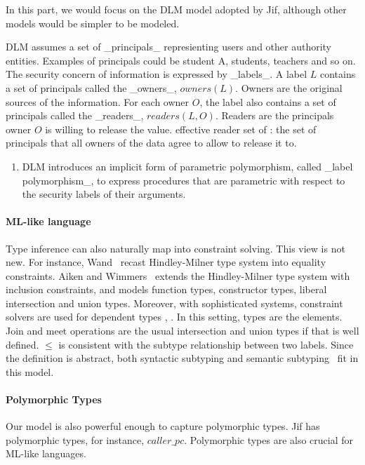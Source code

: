 In this part, we would focus on the DLM model adopted by Jif, although
other models would be simpler to be modeled.

DLM assumes a set of _principals_ represienting users and other authority
entities. Examples of principals could be student A, students, teachers and so
on. The security concern of information is expressed by _labels_. A label $L$
contains a set of principals called the _owners_, $owners(L)$. Owners are the
original sources of the information. For each owner $O$, the label also
contains a set of principals called the _readers_, $readers(L,O)$. Readers are
the principals owner $O$ is willing to release the value. effective reader set of : the set of principals that all
owners of the data agree to allow to release it to. 


\begin{enumerate}
\item DLM introduces an implicit form of parametric polymorphism, called _label
polymorphism_, to express procedures that are parametric with respect to the
security labels of their arguments.
\end{enumerate}

\paragraph{ML-like language}

Type inference can also naturally map into constraint solving. This
view is not new. For instance, Wand~\cite{wand-typeinference} recast
Hindley-Milner type system into equality constraints. Aiken and
Wimmers~\cite{aiken-typeinclusion} extends the Hindley-Milner type
system with inclusion constraints, and models function types,
constructor types, liberal intersection and union types. Moreover,
with sophisticated systems, constraint solvers are used for dependent
types , . In this setting, types are the
elements. Join and meet operations are the usual intersection and
union types if that is well defined.  $\leq$ is consistent with the
subtype relationship between two labels.  Since the definition is
abstract, both syntactic subtyping  and semantic
subtyping~\cite{aiken-typeinclusion} fit in this model.

\paragraph{Polymorphic Types}

Our model is also powerful enough to capture polymorphic types.  Jif
has polymorphic types, for instance, $caller\_pc$. Polymorphic types
are also crucial for ML-like languages.


